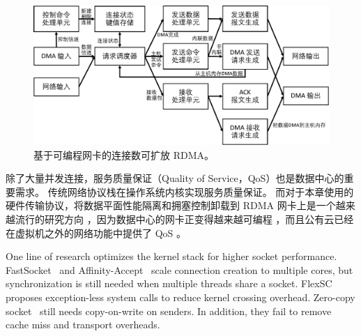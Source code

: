 \begin{figure}[htbp]
	\centering
	\includegraphics[width=1.0\textwidth]{images/scalable_rdma.pdf}	
	\caption{基于可编程网卡的连接数可扩放 RDMA。}
	\label{socksdirect:fig:scalable-rdma}
\end{figure}

除了大量并发连接，服务质量保证（Quality of Service，QoS）也是数据中心的重要需求。
传统网络协议栈在操作系统内核实现服务质量保证。
而对于本章使用的硬件传输协议，将数据平面性能隔离和拥塞控制卸载到 RDMA 网卡上是一个越来越流行的研究方向 \cite {peter2016arrakis,zhu2015congestion,lu2017memory,mprdma,mittal2018revisiting}，因为数据中心的网卡正变得越来越可编程  \cite{smartnic,cavium,kaufmann2015flexnic,mellanox-innova,mellanox-bluefield}，而且公有云已经在虚拟机之外的网络功能中提供了 QoS \cite {li2016clicknp,panda2016netbricks,floem-osdi18}。







\iffalse
{}
One line of research optimizes the kernel stack for higher socket performance. FastSocket~\cite{lin2016scalable} and Affinity-Accept~\cite{pesterev2012improving} scale connection creation to multiple cores, but synchronization is still needed when multiple threads share a socket.
FlexSC~\cite{soares2010flexsc} proposes exception-less system calls to reduce kernel crossing overhead.
Zero-copy socket~\cite{thadani1995efficient,chu1996zero} still needs copy-on-write on senders.
In addition, they fail to remove cache miss and transport overheads.


